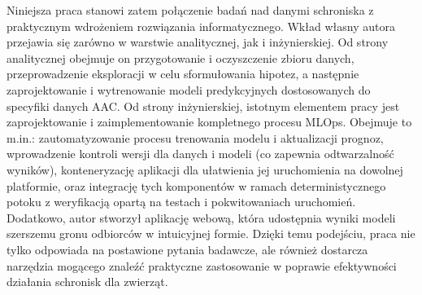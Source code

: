 Niniejsza praca stanowi zatem połączenie badań nad danymi schroniska z praktycznym wdrożeniem rozwiązania informatycznego. Wkład własny autora przejawia się zarówno w warstwie analitycznej, jak i inżynierskiej. Od strony analitycznej obejmuje on przygotowanie i oczyszczenie zbioru danych, przeprowadzenie eksploracji w celu sformułowania hipotez, a następnie zaprojektowanie i wytrenowanie modeli predykcyjnych dostosowanych do specyfiki danych AAC. Od strony inżynierskiej, istotnym elementem pracy jest zaprojektowanie i zaimplementowanie kompletnego procesu MLOps. Obejmuje to m.in.: zautomatyzowanie procesu trenowania modelu i aktualizacji prognoz, wprowadzenie kontroli wersji dla danych i modeli (co zapewnia odtwarzalność wyników), konteneryzację aplikacji dla ułatwienia jej uruchomienia na dowolnej platformie, oraz integrację tych komponentów w ramach deterministycznego potoku z weryfikacją opartą na testach i pokwitowaniach uruchomień. Dodatkowo, autor stworzył aplikację webową, która udostępnia wyniki modeli szerszemu gronu odbiorców w intuicyjnej formie. Dzięki temu podejściu, praca nie tylko odpowiada na postawione pytania badawcze, ale również dostarcza narzędzia mogącego znaleźć praktyczne zastosowanie w poprawie efektywności działania schronisk dla zwierząt.
